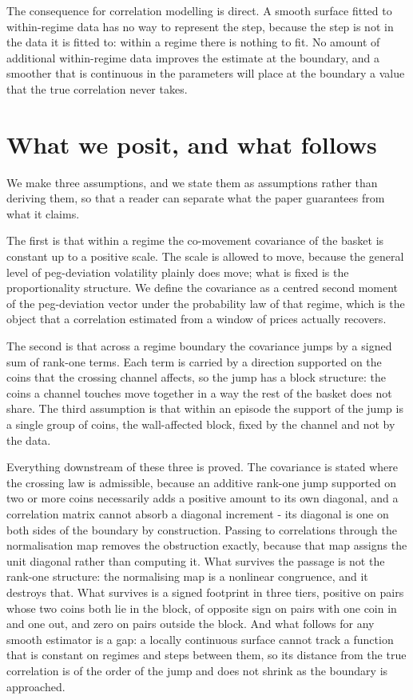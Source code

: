 The consequence for correlation modelling is direct. A smooth surface fitted to within-regime data has no way to represent the step, because the step is not in the data it is fitted to: within a regime there is nothing to fit. No amount of additional within-regime data improves the estimate at the boundary, and a smoother that is continuous in the parameters will place at the boundary a value that the true correlation never takes.

\section*{What we posit, and what follows}

We make three assumptions, and we state them as assumptions rather than deriving them, so that a reader can separate what the paper guarantees from what it claims.

The first is that within a regime the co-movement covariance of the basket is constant up to a positive scale. The scale is allowed to move, because the general level of peg-deviation volatility plainly does move; what is fixed is the proportionality structure. We define the covariance as a centred second moment of the peg-deviation vector under the probability law of that regime, which is the object that a correlation estimated from a window of prices actually recovers.

The second is that across a regime boundary the covariance jumps by a signed sum of rank-one terms. Each term is carried by a direction supported on the coins that the crossing channel affects, so the jump has a block structure: the coins a channel touches move together in a way the rest of the basket does not share. The third assumption is that within an episode the support of the jump is a single group of coins, the wall-affected block, fixed by the channel and not by the data.

Everything downstream of these three is proved. The covariance is stated where the crossing law is admissible, because an additive rank-one jump supported on two or more coins necessarily adds a positive amount to its own diagonal, and a correlation matrix cannot absorb a diagonal increment - its diagonal is one on both sides of the boundary by construction. Passing to correlations through the normalisation map removes the obstruction exactly, because that map assigns the unit diagonal rather than computing it. What survives the passage is not the rank-one structure: the normalising map is a nonlinear congruence, and it destroys that. What survives is a signed footprint in three tiers, positive on pairs whose two coins both lie in the block, of opposite sign on pairs with one coin in and one out, and zero on pairs outside the block. And what follows for any smooth estimator is a gap: a locally continuous surface cannot track a function that is constant on regimes and steps between them, so its distance from the true correlation is of the order of the jump and does not shrink as the boundary is approached.


